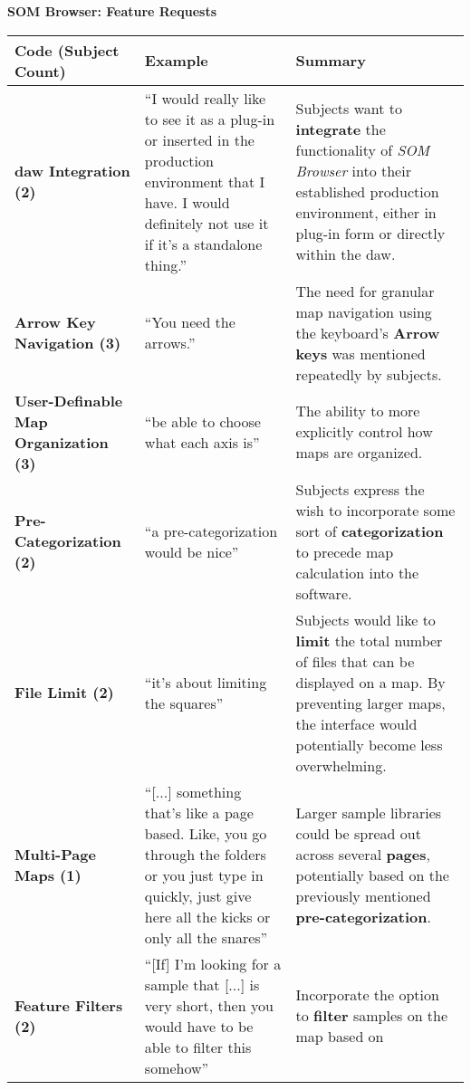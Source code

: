 \begin{table}[!htb]
  \renewcommand{\arraystretch}{1.2}
  \centering
  \textbf{SOM Browser: Feature Requests} \\ [3mm]
  \footnotesize
  \colorbox{light-bg}{
  \begin{tabular}{ p{4.0cm} p{4.75cm} p{4.75cm} }
    \hline
    \textbf{Code (Subject Count)} & \textbf{Example} & \textbf{Summary} \\
    \hline
    \textbf{\gls{daw} Integration (2)}
    &
    ``I would really like to see it as a plug-in or inserted in the production
    environment that I have. I would definitely not use it if it's a
    standalone thing.''
    &
    Subjects want to \textbf{integrate} the functionality of
    \textit{SOM Browser} into their established production environment, either
    in plug-in form or directly within the \gls{daw}.
    \\
    \textbf{Arrow Key Navigation (3)}
    &
    ``You need the arrows.''
    &
    The need for granular map navigation using the keyboard's
    \textbf{Arrow keys} was mentioned repeatedly by subjects.
    \\
    \textbf{User-Definable Map Organization (3)}
    &
    ``be able to choose what each axis is''
    &
    The ability to more explicitly control how maps are organized.
    \\
    \textbf{Pre-Categorization (2)}
    &
    ``a pre-categorization would be nice''
    &
    Subjects express the wish to incorporate some sort of
    \textbf{categorization} to precede map calculation into the software.
    \\
    \textbf{File Limit (2)}
    &
    ``it’s about limiting the squares''
    &
    Subjects would like to \textbf{limit} the total number of files that can be
    displayed on a map. By preventing larger maps, the interface would
    potentially become less overwhelming.
    \\
    \textbf{Multi-Page Maps (1)}
    &
    ``[...] something that’s like a page based. Like, you go through the folders
    or you just type in quickly, just give here all the kicks or only all the
    snares''
    &
    Larger sample libraries could be spread out across several \textbf{pages},
    potentially based on the previously mentioned \textbf{pre-categorization}.
    \\
    \textbf{Feature Filters (2)}
    &
    ``[If] I'm looking for a sample that [...] is very short, then you
    would have to be able to filter this somehow''
    &
    Incorporate the option to \textbf{filter} samples on the map based on

\end{tabular}}
\end{table}
